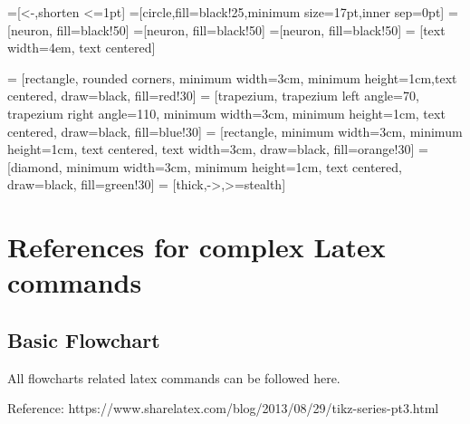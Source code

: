 \documentclass[12pt, right open]{memoir}
\begin{document}


=[<-,shorten <=1pt]
=[circle,fill=black!25,minimum size=17pt,inner sep=0pt]
=[neuron, fill=black!50]
=[neuron, fill=black!50]
=[neuron, fill=black!50]
 = [text width=4em, text centered]

 = [rectangle, rounded corners, minimum width=3cm, minimum height=1cm,text centered, draw=black, fill=red!30]
 = [trapezium, trapezium left angle=70, trapezium right angle=110, minimum width=3cm, minimum height=1cm, text centered, draw=black, fill=blue!30]
 = [rectangle, minimum width=3cm, minimum height=1cm, text centered, text width=3cm, draw=black, fill=orange!30]
 = [diamond, minimum width=3cm, minimum height=1cm, text centered, draw=black, fill=green!30]
 = [thick,->,>=stealth]


\chapter{References for complex Latex commands}
\section{Basic Flowchart}

All flowcharts related latex commands can be followed here.
 
Reference: https://www.sharelatex.com/blog/2013/08/29/tikz-series-pt3.html
\end{document}
